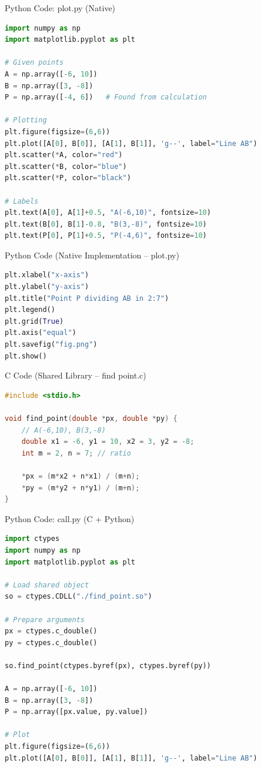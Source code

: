 \documentclass{beamer}
\begin{document}
\begin{frame}[fragile]{Python Code: plot.py (Native)}
\begin{lstlisting}[language=Python]
import numpy as np
import matplotlib.pyplot as plt

# Given points
A = np.array([-6, 10])
B = np.array([3, -8])
P = np.array([-4, 6])   # Found from calculation

# Plotting
plt.figure(figsize=(6,6))
plt.plot([A[0], B[0]], [A[1], B[1]], 'g--', label="Line AB")
plt.scatter(*A, color="red")
plt.scatter(*B, color="blue")
plt.scatter(*P, color="black")

# Labels
plt.text(A[0], A[1]+0.5, "A(-6,10)", fontsize=10)
plt.text(B[0], B[1]-0.8, "B(3,-8)", fontsize=10)
plt.text(P[0], P[1]+0.5, "P(-4,6)", fontsize=10)
\end{lstlisting}
\end{frame}


\begin{frame}[fragile]{Python Code (Native Implementation – plot.py)}
\begin{lstlisting}[language=Python]
plt.xlabel("x-axis")
plt.ylabel("y-axis")
plt.title("Point P dividing AB in 2:7")
plt.legend()
plt.grid(True)
plt.axis("equal")
plt.savefig("fig.png")
plt.show()
\end{lstlisting}
\end{frame}

\begin{frame}[fragile]{C Code (Shared Library – find point.c)}
\begin{lstlisting}[language=C]
#include <stdio.h>

void find_point(double *px, double *py) {
    // A(-6,10), B(3,-8)
    double x1 = -6, y1 = 10, x2 = 3, y2 = -8;
    int m = 2, n = 7; // ratio

    *px = (m*x2 + n*x1) / (m+n);
    *py = (m*y2 + n*y1) / (m+n);
}
\end{lstlisting}
\end{frame}

\begin{frame}[fragile]{Python Code: call.py (C + Python)}
\begin{lstlisting}[language=Python]
import ctypes
import numpy as np
import matplotlib.pyplot as plt

# Load shared object
so = ctypes.CDLL("./find_point.so")

# Prepare arguments
px = ctypes.c_double()
py = ctypes.c_double()

so.find_point(ctypes.byref(px), ctypes.byref(py))

A = np.array([-6, 10])
B = np.array([3, -8])
P = np.array([px.value, py.value])

# Plot
plt.figure(figsize=(6,6))
plt.plot([A[0], B[0]], [A[1], B[1]], 'g--', label="Line AB")
\end{lstlisting}
\end{frame}
\end{document}
